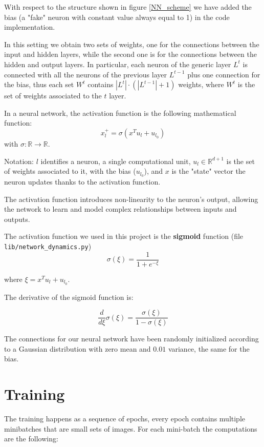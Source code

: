 \documentclass[a4paper,11pt,oneside]{book}
\begin{document}
With respect to the structure shown in figure \ref{NN_scheme} we have added the bias (a "fake" neuron with constant value always equal to 1) in the code implementation.

\bigskip
In this setting we obtain two sets of weights, one for the connections between the input and hidden layers, while the second one is for the connections between the hidden and output layers. In particular, each neuron of the generic layer $L^t$ is connected with all the neurons of the previous layer $L^{t-1}$ plus one connection for the bias, thus each set $W^t$ contains $|L^t| \cdot (|L^{t-1}| + 1)$ weights, where $W^t$ is the set of weights associated to the $t$ layer.

\bigskip
In a neural network, the activation function is the following mathematical function:
\begin{equation}
x_l^+= \sigma(x^T u_l + u_{l_0})
\end{equation}
with $\sigma: \mathbb{R} \to \mathbb{R}$.

Notation: $l$ identifies a neuron, a single computational unit, $u_l \in \mathbb{R}^{d+1}$ is the set of weights associated to it, with the bias ($u_{l_0}$), and $x$ is the "state" vector the neuron updates thanks to the activation function. 

\bigskip
The activation function introduces non-linearity to the neuron's output, allowing the network to learn and model complex relationships between inputs and outputs.

\bigskip
The activation function we used in this project is the \textbf{sigmoid} function (file \texttt{lib/network\_dynamics.py})
\begin{equation}
\sigma(\xi) = \frac{1}{1 + e^{-\xi}}
\end{equation}

where $\xi = x^T u_l + u_{l_0}.$

The derivative of the sigmoid function is:

\begin{equation}
\frac{d}{d\xi}\sigma(\xi) = \frac{\sigma(\xi)}{1 - \sigma(\xi)}
\end{equation}

The connections for our neural network have been randomly initialized according to a Gaussian distribution with zero mean and $0.01$ variance, the same for the bias.

\section{Training}
The training happens as a sequence of epochs, every epoch contains multiple minibatches that are small sets of images. For each mini-batch the computations are the following:
\end{document}
